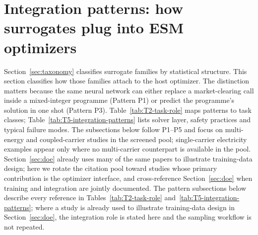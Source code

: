 \section{Integration patterns: how surrogates plug into ESM optimizers}
\label{sec:integration}

Section~\ref{sec:taxonomy} classifies surrogate families by
statistical structure. This section classifies how those families
attach to the host optimizer. The distinction matters because the
same neural network can either replace a market-clearing call inside
a mixed-integer programme (Pattern P1) or predict the programme's
solution in one shot (Pattern P3). Table~\ref{tab:T2-task-role} maps
patterns to task classes; Table~\ref{tab:T5-integration-patterns}
lists solver layer, safety practices and typical failure modes.
The subsections below follow P1--P5 and focus on multi-energy and
coupled-carrier studies in the screened pool; single-carrier
electricity examples appear only where no multi-carrier counterpart
is available in the pool.
Section~\ref{sec:doe} already uses many of the same papers to
illustrate training-data design; here we rotate the citation pool
toward studies whose primary contribution is the optimizer interface,
and cross-reference Section~\ref{sec:doe} when training and
integration are jointly documented.
The pattern subsections below describe every reference in
Tables~\ref{tab:T2-task-role} and~\ref{tab:T5-integration-patterns};
where a study is already used to illustrate training-data design in
Section~\ref{sec:doe}, the integration role is stated here and the
sampling workflow is not repeated.

